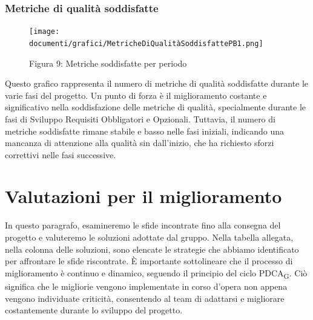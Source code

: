 \documentclass{article}
\begin{document}
\subsubsection{Metriche di qualità soddisfatte}
\begin{figure}[H]
    \centering
    \texttt{[image: documenti/grafici/MetricheDiQualitàSoddisfattePB1.png]}
    \caption{Figura 9: Metriche soddisfatte per periodo}
    \end{figure}
    Questo grafico rappresenta il numero di metriche di qualità soddisfatte durante le varie fasi del progetto. Un punto di forza è il miglioramento costante e significativo nella soddisfazione delle metriche di qualità, specialmente durante le fasi di Sviluppo Requisiti Obbligatori e Opzionali. Tuttavia, il numero di metriche soddisfatte rimane stabile e basso nelle fasi iniziali, indicando una mancanza di attenzione alla qualità sin dall'inizio, che ha richiesto sforzi correttivi nelle fasi successive.

\section{Valutazioni per il miglioramento}
In questo paragrafo, esamineremo le sfide incontrate fino alla consegna del progetto e valuteremo le soluzioni adottate dal gruppo. Nella tabella allegata, nella colonna delle soluzioni, sono elencate le strategie che abbiamo identificato per affrontare le sfide riscontrate. È importante sottolineare che il processo di miglioramento è continuo e dinamico, seguendo il principio del ciclo PDCA\textsubscript{G}. Ciò significa che le migliorie vengono implementate in corso d'opera non appena vengono individuate criticità, consentendo al team di adattarsi e migliorare costantemente durante lo sviluppo del progetto.
\end{document}
